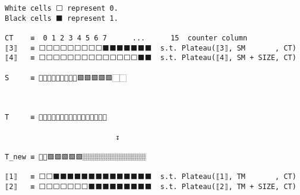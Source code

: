 \documentclass[varwidth=\maxdimen,margin=0.5cm,multi={verbatim}]{standalone}
\begin{document}
\begin{verbatim}
White cells ⬜ represent 0.
Black cells ⬛ represent 1.

CT    ≡  0 1 2 3 4 5 6 7      ...      15  counter column
⟦3⟧   ≡ ⬜⬜⬜⬜⬜⬜⬜⬜⬜⬛⬛⬛⬛⬛⬛⬛  s.t. Plateau(⟦3⟧, SM       , CT)
⟦4⟧   ≡ ⬜⬜⬜⬜⬜⬜⬜⬜⬜⬜⬜⬜⬜⬜⬛⬛  s.t. Plateau(⟦4⟧, SM + SIZE, CT)
        
S     ≡ 🏻🏻🏻🏻🏻🏻🏻🏻🏻🟩🟩🟩🟩🟩🏻🏻
                                      

                                      
T     ≡ 🏽🏽🏽🏽🏽🏽🏽🏽🏽🏽🏽🏽🏽🏽🏽🏽                                   

                          ↧

T_new ≡ 🏽🏽🟩🟩🟩🟩🟩🏽🏽🏽🏽🏽🏽🏽🏽🏽

⟦1⟧   ≡ ⬜⬜⬛⬛⬛⬛⬛⬛⬛⬛⬛⬛⬛⬛⬛⬛  s.t. Plateau(⟦1⟧, TM       , CT)
⟦2⟧   ≡ ⬜⬜⬜⬜⬜⬜⬜⬛⬛⬛⬛⬛⬛⬛⬛⬛  s.t. Plateau(⟦2⟧, TM + SIZE, CT)
\end{verbatim}
\end{document}
